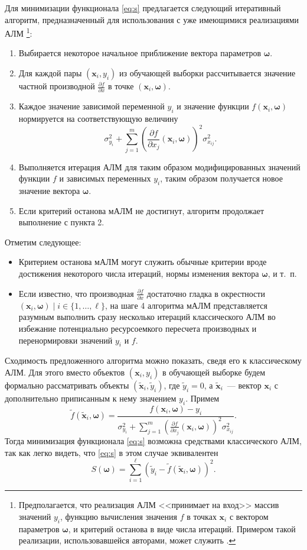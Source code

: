 \documentclass[11pt,a4paper]{article}
\newcommand{\bomega}{\boldsymbol{\omega}}
\begin{document}
Для минимизации функционала \eqref{eq:s} предлагается следующий итеративный алгоритм,
предназначенный для использования с уже имеющимися реализациями АЛМ
\footnote{Предполагается, что реализация АЛМ <<принимает на вход>> массив значений $y_i$,
функцию вычисления значения $f$ в точках $\mathbf{x}_i$ с вектором параметров $\bomega$,
и критерий останова в виде числа итераций. Примером такой реализации, использовавшейся
авторами, может служить \cite{dlib09}.}:
\begin{enumerate}
  \item Выбирается некоторое начальное приближение вектора параметров $\bomega$.
  \item Для каждой пары $(\mathbf{x}_i, y_i)$ из обучающей выборки рассчитывается значение
	частной производной $\frac{\partial f}{\partial x}$ в точке $(\mathbf{x}_i, \bomega)$.
  \item Каждое значение зависимой переменной $y_i$ и значение функции $f(\mathbf{x}_i, \bomega)$
	нормируется на соответствующую величину
	\[
	  \sigma_{y_i}^2 + \sum_{j = 1}^m (\frac{\partial f}{\partial x_j}(\mathbf{x}_i, \bomega))^2 \sigma^2_{x_{ij}}.
	\]
  \item Выполняется итерация АЛМ для таким образом модифицированных значений функции $f$
    и зависимых переменных $y_i$, таким образом получается новое значение вектора $\bomega$.
  \item Если критерий останова мАЛМ не достигнут, алгоритм продолжает выполнение с пункта 2.
\end{enumerate}

Отметим следующее:
\begin{itemize}
  \item Критерием останова мАЛМ могут служить обычные критерии вроде достижения некоторого
    числа итераций, нормы изменения вектора $\bomega$, и т.~п.
  \item Если известно, что производная $\frac{\partial f}{\partial x}$ достаточно гладка
	в окрестности $(\mathbf{x}_i, \bomega) \mid i \in \{ 1, \dots, \ell \}$, на шаге
	4 алгоритма мАЛМ представляется разумным выполнить сразу несколько итераций
	классического АЛМ во избежание потенциально ресурсоемкого пересчета производных и
	перенормировки значений $y_i$ и $f$.
\end{itemize}

Сходимость предложенного алгоритма можно показать, сведя его к классическому АЛМ. Для этого
вместо объектов $(\mathbf{x}_i, y_i)$ в обучающей выборке будем формально рассматривать
объекты $(\tilde{\mathbf{x}}_i, \tilde{y}_i)$, где $\tilde{y}_i = 0$, а
$\tilde{\mathbf{x}}_i$~--- вектор $\mathbf{x}_i$ с дополнительно приписанным к нему
значением $y_i$. Примем
\[
  \tilde{f}(\tilde{\mathbf{x}}_i, \bomega) = \frac{f(\mathbf{x}_i, \bomega) - y_i}{\sigma_{y_i}^2 + \sum_{j = 1}^m (\frac{\partial f}{\partial x_j}(\mathbf{x}_i, \bomega))^2 \sigma^2_{x_{ij}}}.
\]
Тогда минимизация функционала \eqref{eq:s} возможна средствами классического АЛМ, так
как легко видеть, что \eqref{eq:s} в этом случае эквивалентен
\[
  S(\bomega) = \sum_{i = 1}^\ell (\tilde{y}_i - \tilde{f}(\tilde{\mathbf{x}}_i, \bomega))^2.
\]
\end{document}
